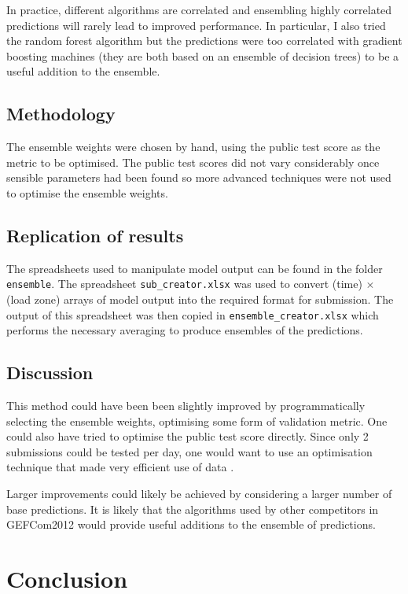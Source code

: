 \documentclass[preprint,authoryear,12pt]{elsarticle}
\begin{document}
In practice, different algorithms are correlated and ensembling highly correlated predictions will rarely lead to improved performance.
In particular, I also tried the random forest algorithm but the predictions were too correlated with gradient boosting machines (they are both based on an ensemble of decision trees) to be a useful addition to the ensemble.

\subsection{Methodology}

The ensemble weights were chosen by hand, using the public test score as the metric to be optimised.
The public test scores did not vary considerably once sensible parameters had been found so more advanced techniques were not used to optimise the ensemble weights.

\subsection{Replication of results}

The spreadsheets used to manipulate model output can be found in the folder \texttt{ensemble}.
The spreadsheet \texttt{sub\_creator.xlsx} was used to convert (time) $\times$ (load zone) arrays of model output into the required format for submission.
The output of this spreadsheet was then copied in \texttt{ensemble\_creator.xlsx} which performs the necessary averaging to produce ensembles of the predictions.

\subsection{Discussion}

This method could have been been slightly improved by programmatically selecting the ensemble weights, optimising some form of validation metric.
One could also have tried to optimise the public test score directly.
Since only 2 submissions could be tested per day, one would want to use an optimisation technique that made very efficient use of data \citep[e.g.][]{Osborne2009, snoek2012practical}.

Larger improvements could likely be achieved by considering a larger number of base predictions.
It is likely that the algorithms used by other competitors in GEFCom2012 would provide useful additions to the ensemble of predictions.

\section{Conclusion}
\end{document}
